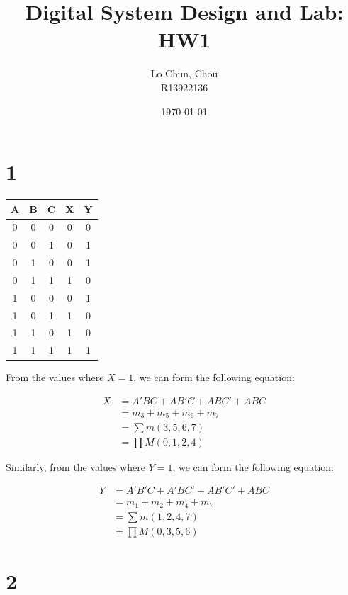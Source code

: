 \documentclass{article}
\title{Digital System Design and Lab: HW1}
\author{Lo Chun, Chou \\ R13922136}
\date\today
\begin{document}
\setlength{\parindent}{0pt}
\maketitle 

\section*{1}

\begin{center}
    \begin{tabular}{ |c|c|c||c|c| } 
        \hline
        \cline{1-5}
        A & B & C & X & Y\\ 
        \hline
        0 & 0 & 0 & 0 & 0 \\ 
        0 & 0 & 1 & 0 & 1 \\ 
        0 & 1 & 0 & 0 & 1 \\ 
        0 & 1 & 1 & 1 & 0 \\ 
        1 & 0 & 0 & 0 & 1 \\
        1 & 0 & 1 & 1 & 0 \\ 
        1 & 1 & 0 & 1 & 0 \\ 
        1 & 1 & 1 & 1 & 1 \\ 
        \hline
    \end{tabular}
\end{center}

From the values where $X=1$, we can form the following equation:

\begin{align*}
    X 
    &= A'BC + AB'C + ABC' + ABC \\
    &= m_3 + m_5 + m_6 + m_7 \\
    &= \sum m(3, 5, 6, 7) \\
    &= \prod M(0, 1, 2, 4)
\end{align*}

Similarly, from the values where $Y=1$, we can form the following equation:

\begin{align*}
    Y
    &= A'B'C + A'BC' + AB'C' + ABC \\
    &= m_1 + m_2 + m_4 + m_7 \\
    &= \sum m(1, 2, 4, 7) \\
    &= \prod M(0, 3, 5, 6)
\end{align*}

\section*{2}
\end{document}

